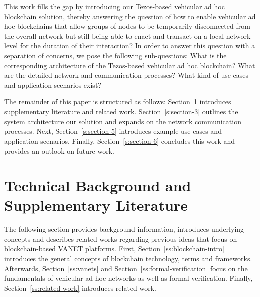 \documentclass{llncs}
\begin{document}
{%


		
		This work fills the gap by introducing our Tezos-based vehicular ad hoc blockchain solution, thereby answering the question of how to enable vehicular ad hoc blockchains that allow groups of nodes to be temporarily disconnected from the overall network but still being able to enact and transact on a local network level for the duration of their interaction? In order to answer this question with a separation of concerns, we pose the following sub-questions: What is the corresponding architecture of the Tezos-based vehicular ad hoc blockchain? What are the detailed network and communication processes? What kind of use cases and application scenarios exist?
		
		The remainder of this paper is structured as follows: Section~\ref{s:section-2} introduces supplementary literature and related work. Section~\ref{s:section-3} outlines the system architecture our solution and expands on the network communication processes. Next, Section~\ref{s:section-5} introduces example use cases and application scenarios. Finally, Section~\ref{s:section-6} concludes this work and provides an outlook on future work.



	\section{Technical Background and Supplementary Literature}	
		\label{s:section-2}
		
		The following section provides background information, introduces underlying concepts and describes related works regarding previous ideas that focus on blockchain-based VANET platforms. First, Section~\ref{ss:blockchain-intro} introduces the general concepts of blockchain technology, terms and frameworks. Afterwards, Section~\ref{ss:vanets} and Section~\ref{ss:formal-verification} focus on the fundamentals of vehicular ad-hoc networks as well as formal verification. Finally, Section~\ref{ss:related-work} introduces related work. 
					
}
\end{document}
